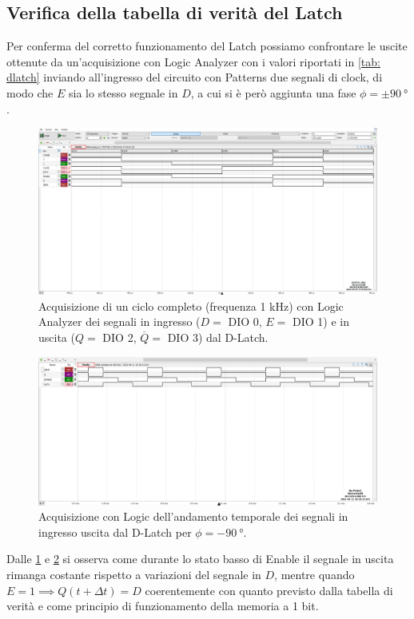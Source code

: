 \documentclass[10pt, a4paper, italian]{article}
\begin{document}
\subsection{Verifica della tabella di verità del Latch}
Per conferma del corretto funzionamento del Latch possiamo confrontare
le uscite ottenute da un'acquisizione con Logic Analyzer con i valori
riportati in \cref{tab: dlatch} inviando all'ingresso del circuito con
Patterns due segnali di clock, di modo che $E$ sia lo stesso segnale in $D$,
a cui si è però aggiunta una fase $\phi = \pm \SI{90}{\degree}$.
\begin{figure}[htbp]
    \centering
    \includegraphics[width=\textwidth]{dlatch}
    \caption{Acquisizione di un ciclo completo (frequenza 1 kHz) con Logic
    Analyzer dei segnali in ingresso ($D =$ DIO 0, $E =$ DIO 1) e in uscita
    ($Q =$ DIO 2, $\overline{Q} =$ DIO 3) dal D-Latch.
    \label{fig: dlatch}}
\end{figure}
\begin{figure}[htbp]
	\includegraphics[width=\textwidth]{latch2}
	\caption{Acquisizione con Logic dell'andamento temporale dei segnali in
	ingresso uscita dal D-Latch per $\phi = -\SI{90}{\degree}$.
	\label{fig: Log_DLATCH2}}
\end{figure}

Dalle \cref{fig: dlatch} e \cref{fig: Log_DLATCH2} si osserva come durante lo
stato basso di Enable il segnale in uscita rimanga costante rispetto a
variazioni del segnale in $D$, mentre quando
$E = 1 \implies Q(t + \Delta t) = D$ coerentemente con quanto previsto dalla
tabella di verità e come principio di funzionamento della memoria a 1 bit.
\end{document}
